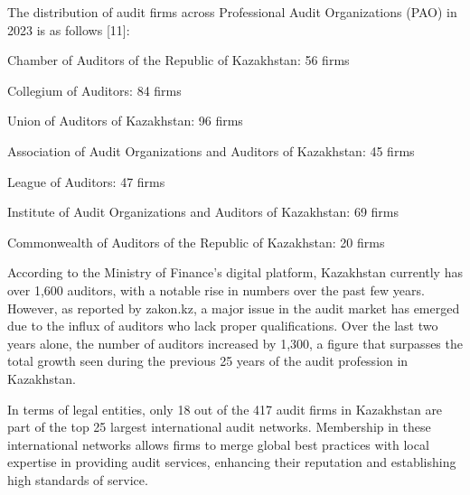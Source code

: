 \begin{multicols}{2}
The distribution of audit firms across Professional Audit Organizations
(PAO) in 2023 is as follows {[}11{]}:

Chamber of Auditors of the Republic of Kazakhstan: 56 firms

Collegium of Auditors: 84 firms

Union of Auditors of Kazakhstan: 96 firms

Association of Audit Organizations and Auditors of Kazakhstan: 45 firms

League of Auditors: 47 firms

Institute of Audit Organizations and Auditors of Kazakhstan: 69 firms

Commonwealth of Auditors of the Republic of Kazakhstan: 20 firms

According to the Ministry of Finance's digital platform, Kazakhstan
currently has over 1,600 auditors, with a notable rise in numbers over
the past few years. However, as reported by zakon.kz, a major issue in
the audit market has emerged due to the influx of auditors who lack
proper qualifications. Over the last two years alone, the number of
auditors increased by 1,300, a figure that surpasses the total growth
seen during the previous 25 years of the audit profession in Kazakhstan.

In terms of legal entities, only 18 out of the 417 audit firms in
Kazakhstan are part of the top 25 largest international audit networks.
Membership in these international networks allows firms to merge global
best practices with local expertise in providing audit services,
enhancing their reputation and establishing high standards of service.
\end{multicols}


